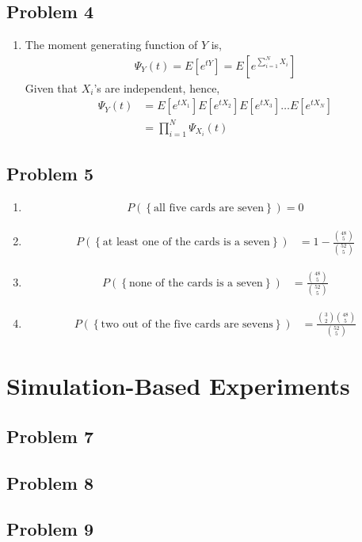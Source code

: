 \documentclass{article}
\begin{document}
	\subsection*{Problem 4}
		\begin{enumerate}
			\item The moment generating function of $Y$ is,
				\begin{align*}
					\Psi_{Y}(t) = E[e^{tY}] = E[e^{\sum_{i=1}^{N}X_{i}}]
				\end{align*}
				Given that $X_{i}$'s are independent, hence,
				\begin{align*}
					\Psi_{Y}(t) &= E[e^{tX_{1}}]E[e^{tX_{2}}]E[e^{tX_{3}}] \ldots E[e^{tX_{N}}] \\
					&= \prod_{i=1}^{N} \Psi_{X_{i}}(t)
				\end{align*}
		\end{enumerate}

	\subsection*{Problem 5}
		\begin{enumerate}
			\item
				\begin{align*}
					P\left(\left\{ \text{all five cards are seven} \right\}\right) = 0
				\end{align*}
			\item
				\begin{align*}
					P\left(\left\{ \text{at least one of the cards is a seven} \right\}\right) &= 1 - \frac{\binom{48}{5}}{\binom{52}{5}}
				\end{align*}
			\item
				\begin{align*}
					P\left(\left\{ \text{none of the cards is a seven} \right\}\right) &= \frac{\binom{48}{5}}{\binom{52}{5}}
				\end{align*}
			\item
				\begin{align*}
					P\left(\left\{ \text{two out of the five cards are sevens} \right\}\right) &= \frac{\binom{3}{2}\binom{48}{5}}{\binom{52}{5}}
				\end{align*}
		\end{enumerate}

\section*{Simulation-Based Experiments}
	\subsection*{Problem 7}
	\subsection*{Problem 8}
	\subsection*{Problem 9}
\end{document}
